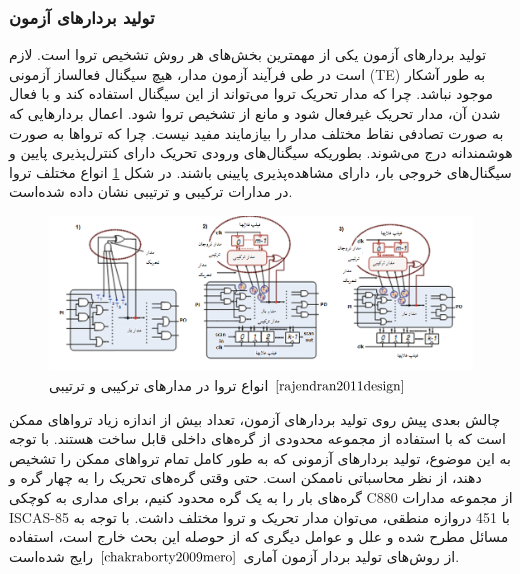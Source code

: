 \subsubsection {تولید بردارهای آزمون}
تولید بردارهای آزمون یکی از مهمترین بخش‌های هر روش تشخیص تروا است. لازم است در طی فرآیند آزمون مدار، هیچ سیگنال فعالساز آزمونی (TE) به طور آشکار موجود نباشد. چرا که مدار تحریک تروا می‌تواند از این سیگنال استفاده کند و با فعال شدن آن، مدار تحریک غیرفعال شود و مانع از تشخیص تروا شود. اعمال بردارهایی که به صورت تصادفی نقاط مختلف مدار را بیازمایند مفید نیست. چرا که تروا‌ها به صورت هوشمندانه درج می‌شوند. بطوریکه سیگنال‌های ورودی تحریک دارای کنترل‌پذیری پایین و سیگنال‌های خروجی بار، دارای مشاهده‌پذیری پایینی باشند. در شکل \ref{fig2-4} انواع مختلف تروا در مدارات ترکیبی و ترتیبی نشان داده شده‌است.
\begin{figure}
	\begin{center}
		\includegraphics[scale=.5]{figs/fig2-4.png}
		\caption[انواع تروا در مدارهای ترکیبی و ترتیبی]
		{انواع تروا در مدارهای ترکیبی و ترتیبی $\cite{rajendran2011design}$}
		\label{fig2-4}
	\end{center}
\end{figure}
چالش بعدی پیش روی تولید بردارهای آزمون، تعداد بیش از اندازه زیاد تروا‌های ممکن است که با استفاده از مجموعه محدودی از گره‌های داخلی قابل ساخت هستند. با توجه به این موضوع، تولید بردارهای آزمونی که به طور کامل تمام تروا‌های ممکن را تشخیص دهند، از نظر محاسباتی ناممکن است. حتی وقتی گره‌های تحریک را به چهار گره و گره‌های بار را به یک گره محدود کنیم، برای مداری به کوچکی C880 از مجموعه مدارات ISCAS-85 با 451 دروازه منطقی، می‌توان  مدار تحریک و  تروا مختلف داشت. با توجه به مسائل مطرح شده و علل و عوامل دیگری که از حوصله این بحث خارج است، استفاده از روش‌های تولید بردار آزمون آماری $\cite{chakraborty2009mero}$ رایج شده‌است.
